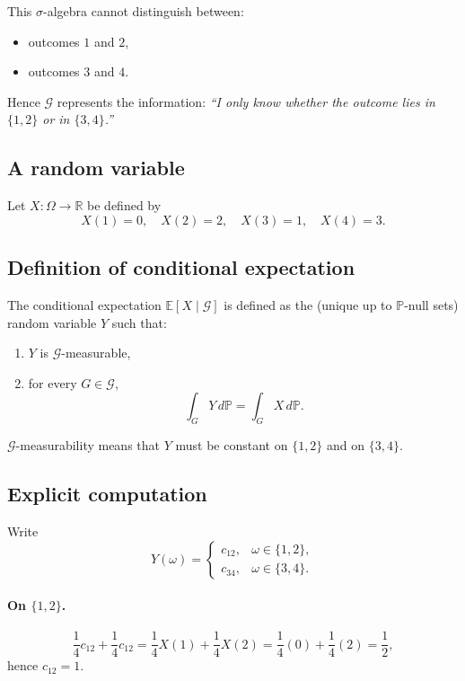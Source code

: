 \documentclass[11pt]{article}
\theoremstyle{remark}
\begin{document}
This $\sigma$-algebra cannot distinguish between:
\begin{itemize}
  \item outcomes $1$ and $2$,
  \item outcomes $3$ and $4$.
\end{itemize}

Hence $\mathcal G$ represents the information:
\emph{``I only know whether the outcome lies in $\{1,2\}$ or in $\{3,4\}$.''}

\subsection{A random variable}

Let $X:\Omega\to\mathbb R$ be defined by
\[
X(1)=0,\quad
X(2)=2,\quad
X(3)=1,\quad
X(4)=3.
\]

\subsection{Definition of conditional expectation}

The conditional expectation $\mathbb E[X\mid\mathcal G]$ is defined as the
(unique up to $\mathbb P$-null sets) random variable $Y$ such that:
\begin{enumerate}
  \item $Y$ is $\mathcal G$-measurable,
  \item for every $G\in\mathcal G$,
  \[
  \int_G Y\,d\mathbb P = \int_G X\,d\mathbb P.
  \]
\end{enumerate}

$\mathcal G$-measurability means that $Y$ must be constant on $\{1,2\}$ and on $\{3,4\}$.

\subsection{Explicit computation}

Write
\[
Y(\omega) =
\begin{cases}
c_{12}, & \omega\in\{1,2\},\\
c_{34}, & \omega\in\{3,4\}.
\end{cases}
\]

\paragraph{On $\{1,2\}$.}
\[
\frac14 c_{12} + \frac14 c_{12}
=
\frac14 X(1) + \frac14 X(2)
=
\frac14(0) + \frac14(2) = \frac12,
\]
hence $c_{12}=1$.
\end{document}
